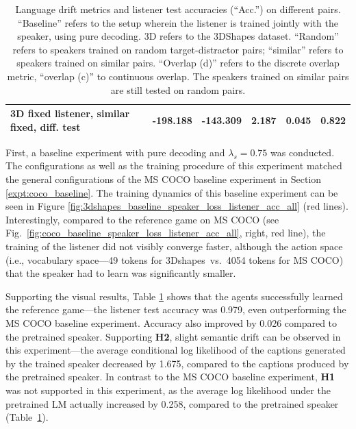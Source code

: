 \begin{table}[]
\begin{tabularx}{\textwidth}{|X|l|l|X|X|X|}
		3D fixed listener, similar fixed, diff. test & -198.188   & -143.309      & 2.187   & 0.045    & 0.822     \\ \hline
	\end{tabularx}
	\caption{\label{tab:3dshapes_drift_metrics_basic_baseline} Language drift metrics and listener test accuracies (``Acc.'') on different pairs. 
		``Baseline'' refers to the setup wherein the listener is trained jointly with the speaker, using pure decoding. 3D refers to the 3DShapes dataset. ``Random'' refers to speakers trained on random target-distractor pairs; ``similar'' refers to speakers trained on similar pairs. ``Overlap (d)'' refers to the discrete overlap metric, ``overlap (c)'' to continuous overlap. The speakers trained on similar pairs are still tested on random pairs.}
\end{table}

First, a baseline experiment with pure decoding and $\lambda_s = 0.75$ was conducted.
The configurations as well as the training procedure of this experiment matched the general configurations of the MS COCO baseline experiment in Section \ref{expt:coco_baseline}. The training dynamics of this baseline experiment can be seen in Figure \ref{fig:3dshapes_baseline_speaker_loss_listener_acc_all} (red lines). Interestingly, compared to the reference game on MS COCO (see Fig.~\ref{fig:coco_baseline_speaker_loss_listener_acc_all}, right, red line), the training of the listener did not visibly converge faster, although the action space (i.e., vocabulary space---49 tokens for 3Dshapes~vs.~4054 tokens for MS COCO) that the speaker had to learn was significantly smaller. 
 
Supporting the visual results, Table \ref{tab:3dshapes_drift_metrics_basic_baseline} shows that the agents successfully learned the reference game---the listener test accuracy was 0.979, even outperforming the MS COCO baseline experiment. Accuracy also improved by 0.026 compared to the pretrained speaker. 
Supporting \textbf{H2}, slight semantic drift can be observed in this experiment---the average conditional log likelihood of the captions generated by the trained speaker decreased by 1.675, compared to the captions produced by the pretrained speaker. In contrast to the MS COCO baseline experiment, \textbf{H1} was not supported in this experiment, as the average log likelihood under the pretrained LM actually increased by 0.258, compared to the pretrained speaker (Table~\ref{tab:3dshapes_drift_metrics_basic_baseline}).
 
